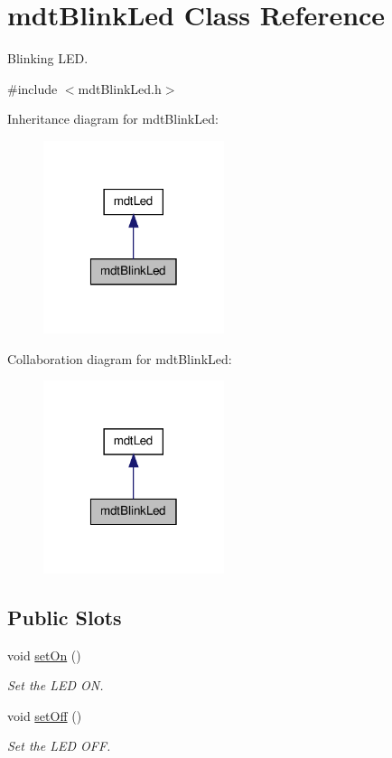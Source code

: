 \hypertarget{classmdt_blink_led}{
\section{mdtBlinkLed Class Reference}
\label{classmdt_blink_led}
}


Blinking LED.  




{\ttfamily \#include $<$mdtBlinkLed.h$>$}



Inheritance diagram for mdtBlinkLed:
\nopagebreak
\begin{figure}[H]
\begin{center}
\leavevmode
\includegraphics[width=150pt]{classmdt_blink_led__inherit__graph}
\end{center}
\end{figure}


Collaboration diagram for mdtBlinkLed:
\nopagebreak
\begin{figure}[H]
\begin{center}
\leavevmode
\includegraphics[width=150pt]{classmdt_blink_led__coll__graph}
\end{center}
\end{figure}
\subsection*{Public Slots}
\begin{DoxyCompactItemize}
\item 
void \hyperlink{classmdt_blink_led_ae51c54f31a11dbaebe69ab2c0b814d0f}{setOn} ()
\begin{DoxyCompactList}\small\item\em Set the LED ON. \end{DoxyCompactList}\item 
void \hyperlink{classmdt_blink_led_a951465e8a9ae5167e7eb05a7107ab13f}{setOff} ()
\begin{DoxyCompactList}\small\item\em Set the LED OFF. \end{DoxyCompactList}\end{DoxyCompactItemize}
